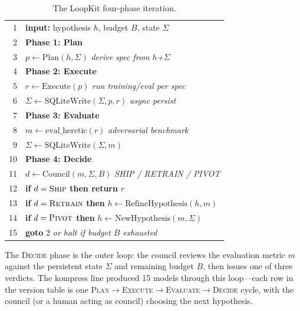\begin{table}[h]
\centering
\caption{The LoopKit four-phase iteration.}
\label{alg:fourphase}
\begin{tabular}{@{}r@{\hspace{1em}}l@{}}
\toprule
1  & \textbf{input:} hypothesis $h$, budget $B$, state $\Sigma$ \\
2  & \textbf{Phase 1: Plan} \\
3  & \quad $p \gets \mathrm{Plan}(h, \Sigma)$ \hfill {\footnotesize\textit{derive spec from $h$+$\Sigma$}} \\
4  & \textbf{Phase 2: Execute} \\
5  & \quad $r \gets \mathrm{Execute}(p)$ \hfill {\footnotesize\textit{run training/eval per spec}} \\
6  & \quad $\Sigma \gets \mathrm{SQLiteWrite}(\Sigma, p, r)$ \hfill {\footnotesize\textit{async persist}} \\
7  & \textbf{Phase 3: Evaluate} \\
8  & \quad $m \gets \mathrm{eval\_heretic}(r)$ \hfill {\footnotesize\textit{adversarial benchmark}} \\
9  & \quad $\Sigma \gets \mathrm{SQLiteWrite}(\Sigma, m)$ \\
10 & \textbf{Phase 4: Decide} \\
11 & \quad $d \gets \mathrm{Council}(m, \Sigma, B)$ \hfill {\footnotesize\textit{SHIP / RETRAIN / PIVOT}} \\
12 & \quad \textbf{if} $d = \textsc{Ship}$ \textbf{then return} $r$ \\
13 & \quad \textbf{if} $d = \textsc{Retrain}$ \textbf{then} $h \gets \mathrm{RefineHypothesis}(h, m)$ \\
14 & \quad \textbf{if} $d = \textsc{Pivot}$ \textbf{then} $h \gets \mathrm{NewHypothesis}(m, \Sigma)$ \\
15 & \textbf{goto} 2 \hfill {\footnotesize\textit{or halt if budget $B$ exhausted}} \\
\bottomrule
\end{tabular}
\end{table}

The \textsc{Decide} phase is the outer loop: the council reviews the
evaluation metric $m$ against the persistent state $\Sigma$ and remaining
budget $B$, then issues one of three verdicts. The kompress line produced 15
models through this loop---each row in the version table is one
\textsc{Plan}$\to$\textsc{Execute}$\to$\textsc{Evaluate}$\to$\textsc{Decide}
cycle, with the council (or a human acting as council) choosing the next
hypothesis.

